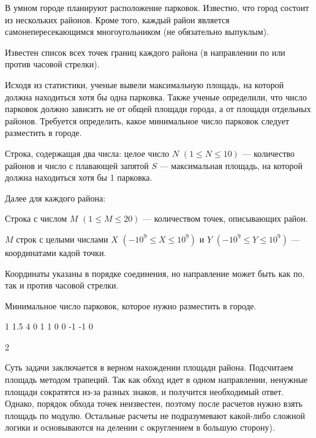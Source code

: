 
В умном городе планируют расположение парковок. Известно, что город состоит из нескольких районов. Кроме того, каждый район является самонепересекающимся многоугольником (не обязательно выпуклым).

Известен список всех точек границ каждого района (в направлении по или против часовой стрелки).

Исходя из статистики, ученые вывели максимальную площадь, на которой должна находиться хотя бы одна парковка. Также ученые определили, что число парковок должно зависить не от общей площади города, а от площади отдельных районов. Требуется определить, какое минимальное число парковок следует разместить в городе.


Строка, содержащая два числа: целое число $N$ $(1 \leq N \leq 10)$ — количество районов и число с плавающей запятой $S$ — максимальная площадь, на которой должна находиться хотя бы 1 парковка.

Далее для каждого района:

Строка с числом $M$ $(1 \leq M \leq 20)$ — количеством точек, описывающих район.

$M$ строк с целыми числами $X$ $(-10^9 \leq X \leq 10^9)$ и $Y$ $(-10^9 \leq Y \leq 10^9)$ — координатами кадой точки.

Координаты указаны в порядке соединения, но направление может быть как по, так и против часовой стрелки.

\outputfmtSection

Минимальное число парковок, которое нужно разместить в городе.


\begin{myverbbox}[\small]{\vinput}
    1 1.5
    4
    0 1
    1 0
    0 -1
    -1 0
\end{myverbbox}
\begin{myverbbox}[\small]{\voutput}
    2
\end{myverbbox}

\solutionSection

Суть задачи заключается в верном нахождении площади района. Подсчитаем площадь методом трапеций. Так как обход идет в одном направлении, ненужные площади сократятся из-за разных знаков, и получится необходимый ответ. Однако, порядок обхода точек неизвестен, поэтому после расчетов нужно взять площадь по модулю. Остальные расчеты не подразумевают какой-либо сложной логики и основываются на делении с округлением в большую сторону).

